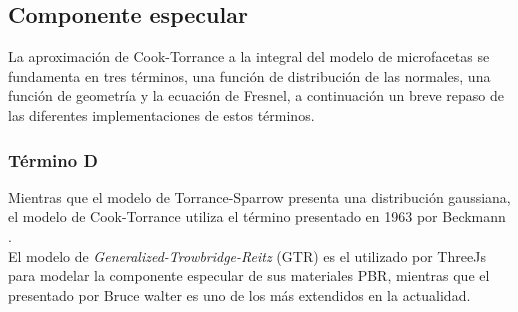         \subsection{Componente especular}
            La aproximaci\'on de Cook-Torrance a la integral del modelo de microfacetas se fundamenta en tres t\'erminos,
            una funci\'on de distribuci\'on de las normales, una funci\'on
            de geometr\'ia y la ecuaci\'on de Fresnel, a continuaci\'on un breve repaso de las diferentes implementaciones de estos
            t\'erminos.
        


            \subsubsection*{T\'ermino D}
                Mientras que el modelo de Torrance-Sparrow \autocite{torrancesparrow} presenta una distribuci\'on gaussiana, el modelo
                de Cook-Torrance \autocite{cooktorrance} utiliza el t\'ermino presentado en 1963 por Beckmann \autocite{beckmann}.\\

                El modelo de \textit{Generalized-Trowbridge-Reitz} (GTR) \autocite{disney12} es el utilizado por ThreeJs para modelar la componente especular de sus
                materiales PBR, mientras que el presentado por Bruce walter \autocite{ggx} es uno de los m\'as extendidos en la actualidad.\\

